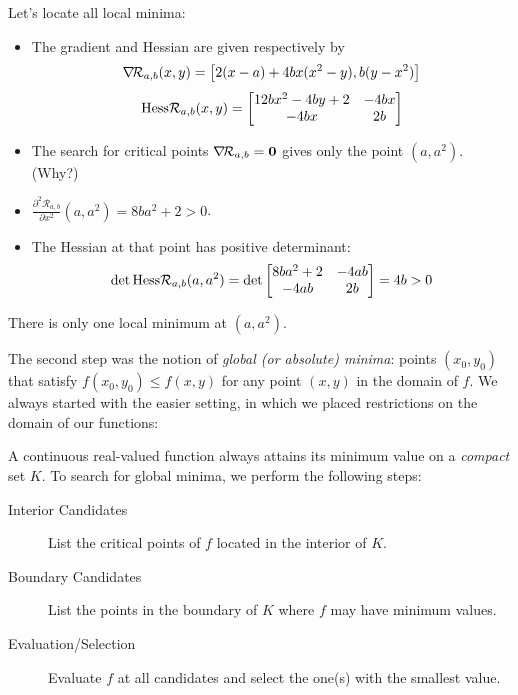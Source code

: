 \begin{example}
Let's locate all local minima:
\begin{itemize}
	\item The gradient and Hessian are given respectively by
	\begin{equation*}
	\mathop{\nabla\! {\mathcal{R}_{a,b}}}(x,y) = \big[ 2(x-a) +4bx(x^2-y) , b(y-x^2) \big] \\
	\end{equation*}
	\begin{equation*}
	\mathop{\mathrm{Hess}{\mathcal{R}_{a,b}}}(x,y) = \begin{bmatrix}
	12bx^2-4by+2 & -4bx \\
	-4bx & 2b
	\end{bmatrix}
	\end{equation*}
	\item The search for critical points $\mathop{\nabla\! {\mathcal{R}_{a,b}}} = \boldsymbol{0}$ gives only the point $(a,a^2)$. (Why?)
	\item $\frac{\partial^2 \mathcal{R}_{a,b}}{\partial x^2}(a,a^2) = 8ba^2+2 > 0$.
	\item The Hessian at that point has positive determinant:
	\begin{equation*}
	\det \mathop{\mathrm{Hess}{\mathcal{R}_{a,b}}}(a,a^2) = \det \begin{bmatrix}
	8ba^2+2 & -4ab \\
	-4ab & 2b
	\end{bmatrix} = 4b > 0
	\end{equation*}
\end{itemize}
There is only one local minimum at $(a,a^2)$.
\end{example}

The second step was the notion of \emph{global (or absolute) minima}: points $(x_0,y_0)$ that satisfy $f(x_0,y_0) \leq f(x,y)$ for any point $(x,y)$ in the domain of $f$.  We always started with the easier setting, in which we placed restrictions on the domain of our functions:

\begin{theorem}\label{theorem:MaxMinCompact}
A continuous real-valued function always attains its minimum value on a \emph{compact} set $K$. To search for global minima, we perform the following steps:
\begin{description}
	\item[Interior Candidates] List the critical points of $f$ located in the interior of $K$.
	\item[Boundary Candidates] List the points in the boundary of $K$ where $f$ may have minimum values.
	\item [Evaluation/Selection] Evaluate $f$ at all candidates and select the one(s) with the smallest value.
\end{description}
\end{theorem}

